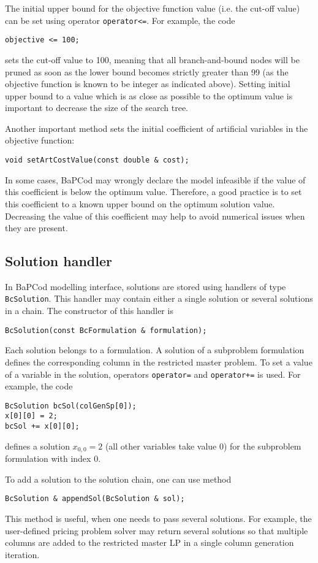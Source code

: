 \documentclass[10pt,a4paper]{article}
\newcommand{\bc}{BaPCod\xspace}
\begin{document}
The initial upper bound for the objective function value (i.e. the cut-off value) can be set using operator
\verb+operator<=+. For example, the code
\begin{lstlisting}
objective <= 100;
\end{lstlisting}
sets the cut-off value to 100, meaning that all branch-and-bound nodes will be pruned as soon as the lower bound becomes
strictly greater than 99 (as the objective function is known to be integer as indicated above). Setting initial upper
bound to a value which is as close as possible to the optimum value is important to decrease the size of the search tree.

Another important method sets the initial coefficient of artificial variables in the objective function:
\begin{lstlisting}
void setArtCostValue(const double & cost);
\end{lstlisting}
In some cases, \bc may wrongly declare the model infeasible if the value of this coefficient is below the optimum
value. Therefore, a good practice is to set this coefficient to a known upper bound on the optimum solution
value. Decreasing the value of this coefficient may help to avoid numerical issues when they are present.

\subsection{Solution handler}
\label{sec:solution}

In \bc modelling interface, solutions are stored using handlers of type \verb+BcSolution+. This handler may contain either
a single solution or several solutions in a chain. The constructor of this handler is
\begin{lstlisting}
BcSolution(const BcFormulation & formulation);
\end{lstlisting}

Each solution belongs to a formulation. A solution of a subproblem formulation defines the corresponding column in the
restricted master problem. To set a value of a variable in the solution, operators \verb+operator=+ and
\verb_operator+=_ is used. For example, the code
\begin{lstlisting}
BcSolution bcSol(colGenSp[0]);
x[0][0] = 2;
bcSol += x[0][0];
\end{lstlisting}
defines a solution $x_{0,0} = 2$ (all other variables take value $0$) for the subproblem formulation with index $0$.

To add a solution to the solution chain, one can use method
\begin{lstlisting}
BcSolution & appendSol(BcSolution & sol);
\end{lstlisting}
This method is useful, when one needs to pass several solutions. For example, the user-defined pricing problem solver
may return several solutions so that multiple columns are added to the restricted master LP in a single column
generation iteration.
\end{document}
